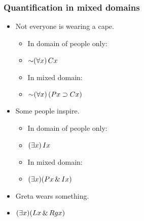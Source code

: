\begin{frame}
\frametitle{Quantification in mixed domains}

\begin{itemize}[<+->]
\item Not everyone is wearing a cape.
\begin{itemize}
  \item In domain of people only:
  \item[] \alert{$\enot \qt{\forall}{x}\, C\qv{x}$}
  \item In mixed domain:
  \item[] \alert{$\enot \qt{\forall}{x}\, (P\qv{x} \eif C\qv{x})$}
\end{itemize}
\item Some people inspire.
\begin{itemize}[<+->]
  \item In domain of people only:
  \item[] \alert{$(\exists x)\,Ix$}
  \item In mixed domain:
  \item[] \alert{$(\exists x)(Px \,\&\, Ix)$}
\end{itemize}
\item Greta wears something.
\item[] \alert{$(\exists x)(Lx \,\&\, Rgx)$}
\end{itemize}
\end{frame}

